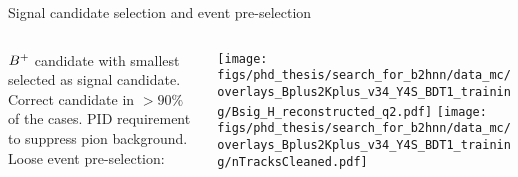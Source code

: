 \begin{frame}{Signal candidate selection and event pre-selection}
\begin{columns}
\begin{column}{0.5\linewidth}
\bi
\item $B^+$ candidate with smallest \qrec selected as signal candidate.
\bi
\itemiii Correct candidate in $>90\%$ of the cases.
\itemiii PID requirement to suppress pion background.
\ei
\itemiii Loose event pre-selection: 
\bi
{}
\ei
\ei
\end{column}
\begin{column}{0.5\linewidth}
\centering
\texttt{[image: figs/phd\_thesis/search\_for\_b2hnn/data\_mc/overlays\_Bplus2Kplus\_v34\_Y4S\_BDT1\_training/Bsig\_H\_reconstructed\_q2.pdf]}
\texttt{[image: figs/phd\_thesis/search\_for\_b2hnn/data\_mc/overlays\_Bplus2Kplus\_v34\_Y4S\_BDT1\_training/nTracksCleaned.pdf]}
\end{column}
\end{columns}
\end{frame}
